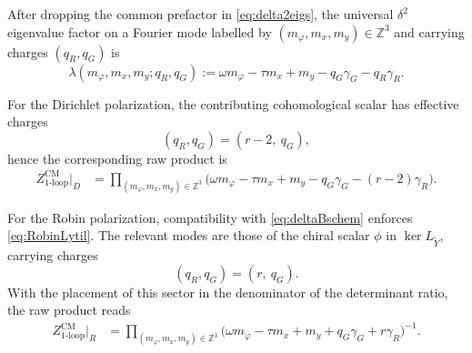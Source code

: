 \documentclass[11pt,a4paper]{article}
\numberwithin{equation}{section}
\theoremstyle{plain}
\theoremstyle{definition}
\theoremstyle{remark}
\begin{document}
After dropping the common prefactor in \eqref{eq:delta2eigs}, the universal $\delta^2$ eigenvalue factor on a Fourier mode labelled by
$(m_\varphi,m_x,m_y)\in\mathbb{Z}^3$ and carrying charges $(q_R,q_G)$ is
\begin{equation}
\lambda(m_\varphi,m_x,m_y;q_R,q_G)
:=
\omega m_\varphi-\tau m_x+m_y-q_G\gamma_G-q_R\gamma_R.
\label{eq:lambda-universal}
\end{equation}


For the Dirichlet polarization, the contributing cohomological scalar has effective charges
\begin{equation}
(q_R,q_G)=(r-2,\ q_G),
\label{eq:charges-D}
\end{equation}
hence the corresponding raw product is
\begin{align}
Z^{\mathrm{CM}}_{\mathrm{1\mbox{-}loop}}\big|_{D} 
& =
\prod_{(m_\varphi,m_x,m_y)\in\mathbb{Z}^3}
\Big(\omega m_\varphi-\tau m_x+m_y-q_G\gamma_G-(r-2)\gamma_R\Big).
\label{eq:ZrawD}
\end{align}

For the Robin polarization, compatibility with \eqref{eq:deltaBschem} enforces \eqref{eq:RobinLytil}. The relevant modes are those of the chiral scalar $\phi$ in $\ker L_{\widetilde Y}$, carrying charges
\begin{equation}
(q_R,q_G)=(r,\ q_G).
\label{eq:charges-R}
\end{equation}
With the placement of this sector in the denominator of the determinant ratio, the raw product reads
\begin{align}
Z^{\mathrm{CM}}_{\mathrm{1\mbox{-}loop}}\big|_{R} 
& =
\prod_{(m_\varphi,m_x,m_y)\in\mathbb{Z}^3}
\Big(\omega m_\varphi-\tau m_x+m_y+q_G\gamma_G+r\gamma_R\Big)^{-1}.
\label{eq:ZrawR}
\end{align}
\end{document}
